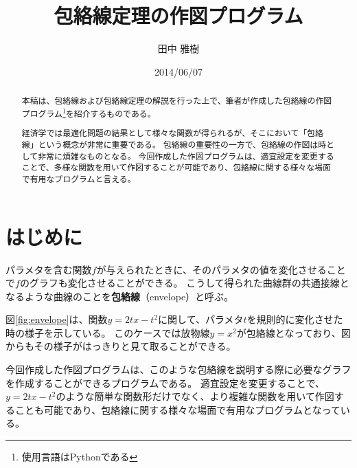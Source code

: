\documentclass[11pt,a4j]{jarticle}
\title{包絡線定理の作図プログラム}
\author{田中 雅樹}
\date{2014/06/07}
\begin{document}
\maketitle

\begin{abstract}
本稿は、包絡線および包絡線定理の解説を行った上で、筆者が作成した包絡線の作図プログラム\footnote{使用言語はPythonである}を紹介するものである。

経済学では最適化問題の結果として様々な関数が得られるが、そこにおいて「包絡線」という概念が非常に重要である。
包絡線の重要性の一方で、包絡線の作図は時として非常に煩雑なものとなる。
今回作成した作図プログラムは、適宜設定を変更することで、多様な関数を用いて作図することが可能であり、包絡線に関する様々な場面で有用なプログラムと言える。
\end{abstract}

\section{はじめに}
パラメタを含む関数$f$が与えられたときに、そのパラメタの値を変化させることで$f$のグラフも変化させることができる。
こうして得られた曲線群の共通接線となるような曲線のことを\textbf{包絡線}（envelope）と呼ぶ。

図\ref{fig:envelope}は、関数$y=2tx-t^{2}$に関して、パラメタ$t$を規則的に変化させた時の様子を示している。
このケースでは放物線$y=x^{2}$が包絡線となっており、図からもその様子がはっきりと見て取ることができる。

今回作成した作図プログラムは、このような包絡線を説明する際に必要なグラフを作成することができるプログラムである。
適宜設定を変更することで、$y=2tx-t^{2}$のような簡単な関数形だけでなく、より複雑な関数を用いて作図することも可能であり、包絡線に関する様々な場面で有用なプログラムとなっている。
\end{document}

